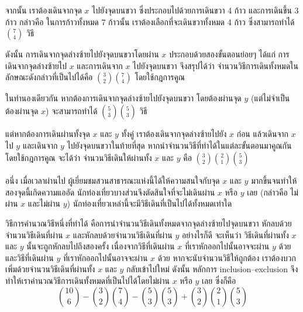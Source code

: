 \begin{example}
จากนั้น เราต้องเดินจากจุด $x$ ไปยังจุดบนขวา ซึ่งประกอบไปด้วยการเดินขวา 4 ก้าว และการเดินขึ้น 3 ก้าว กล่าวคือ ในการก้าวทั้งหมด 7 ก้าวนั้น เราต้องเลือกที่จะเดินขวาทั้งหมด 4 ก้าว ซึ่งสามารถทำได้ $\binom{7}{4}$ วิธี

ดังนั้น การเดินจากจุดล่างซ้ายไปยังจุดบนขวาโดยผ่าน $x$ ประกอบด้วยสองขั้นตอนย่อยๆ ได้แก่ การเดินจากจุดล่างซ้ายไป $x$ และการเดินจาก $x$ ไปยังจุดบนขวา จึงสรุปได้ว่า จำนวนวิธีการเดินทั้งหมดในลักษณะดังกล่าวที่เป็นไปได้คือ $\binom{3}{2}\binom{7}{4}$ โดยใช้กฎการคูณ

ในทำนองเดียวกัน หากต้องการเดินจากจุดล่างซ้ายไปยังจุดบนขวา โดยต้องผ่านจุด $y$ (แต่ไม่จำเป็นต้องผ่านจุด $x$) จะสามารถทำได้ $\binom{5}{3}\binom{5}{3}$ วิธี

แต่หากต้องการเดินผ่านทั้งจุด $x$ และ $y$ ทั้งคู่ เราต้องเดินจากจุดล่างซ้ายไปยัง $x$ ก่อน แล้วเดินจาก $x$ ไป $y$ และเดินจาก $y$ ไปยังจุดบนขวาในท้ายที่สุด \enskip หากนำจำนวนวิธีที่ทำได้ในแต่ละขั้นตอนมาคูณกันโดยใช้กฎการคูณ จะได้ว่า จำนวนวิธีเดินให้ผ่านทั้ง $x$ และ $y$ คือ $\binom{3}{2}\binom{2}{1}\binom{5}{3}$

อนึ่ง เมื่อเวลาผ่านไป ผู้เยี่ยมชมสวนสาธารณะแห่งนี้ได้ให้ความสนใจกับจุด $x$ และ $y$ มากขึ้นจนทำให้สองจุดนี้เกิดความแออัด \enskip นักท่องเที่ยวบางส่วนจึงตัดสินใจที่จะไม่เดินผ่าน $x$ หรือ $y$ เลย (กล่าวคือ ไม่ผ่าน $x$ และไม่ผ่าน $y$) \enskip นักท่องเที่ยวเหล่านี้จะมีวิธีเดินที่เป็นไปได้ทั้งหมดเท่าใด

วิธีการคำนวณวิธีหนึ่งที่ทำได้ คือการนำจำนวนวิธีเดินทั้งหมดจากจุดล่างซ้ายไปจุดบนขวา หักลบด้วยจำนวนวิธีเดินที่ผ่าน $x$ และหักลบด้วยจำนวนวิธีเดินที่ผ่าน $y$ 
\enskip อย่างไรก็ดี จะเห็นว่า วิธีเดินที่ผ่านทั้ง $x$ และ $y$ นั้นจะถูกหักลบไปถึงสองครั้ง เนื่องจากวิธีที่เดินผ่าน $x$ ที่เราหักออกไปนั้นอาจจะผ่าน $y$ ด้วย และวิธีที่เดินผ่าน $y$ ที่เราหักออกไปนั้นอาจจะผ่าน $x$ ด้วย \enskip หากจะนับจำนวนวิธีให้ถูกต้อง เราต้องบวกเพิ่มด้วยจำนวนวิธีเดินที่ผ่านทั้ง $x$ และ $y$ กลับเข้าไปใหม่ \enskip ดังนั้น หลักการ inclusion--exclusion จึงทำให้เราคำนวณวิธีการเดินทั้งหมดที่เป็นไปได้โดยไม่ผ่าน $x$ หรือ $y$ เลย ซึ่งก็คือ
\[\binom{10}{6}-\binom{3}{2}\binom{7}{4}-\binom{5}{3}\binom{5}{3}+\binom{3}{2}\binom{2}{1}\binom{5}{3}\]
\end{example}

